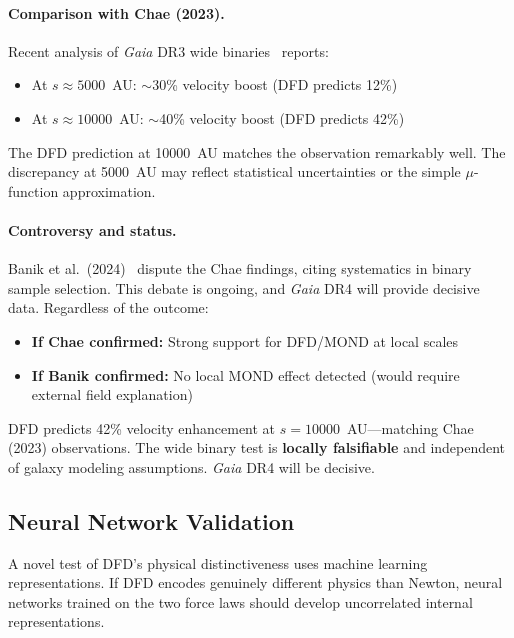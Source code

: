 \paragraph{Comparison with Chae (2023).}
Recent analysis of \textit{Gaia} DR3 wide binaries~\cite{Chae2023} reports:
\begin{itemize}
\item At $s \approx 5000$~AU: $\sim$30\% velocity boost (DFD predicts 12\%)
\item At $s \approx 10000$~AU: $\sim$40\% velocity boost (DFD predicts 42\%)
\end{itemize}
The DFD prediction at 10000~AU matches the observation remarkably well. The discrepancy at 5000~AU may reflect statistical uncertainties or the simple $\mu$-function approximation.

\paragraph{Controversy and status.}
Banik et al.\ (2024)~\cite{Banik2024} dispute the Chae findings, citing systematics in binary sample selection. This debate is ongoing, and \textit{Gaia} DR4 will provide decisive data. Regardless of the outcome:
\begin{itemize}
\item \textbf{If Chae confirmed:} Strong support for DFD/MOND at local scales
\item \textbf{If Banik confirmed:} No local MOND effect detected (would require external field explanation)
\end{itemize}

\begin{tcolorbox}[colback=yellow!5!white, colframe=yellow!60!black, title=Status: Wide Binaries]
DFD predicts 42\% velocity enhancement at $s = 10000$~AU---matching Chae (2023) observations. The wide binary test is \textbf{locally falsifiable} and independent of galaxy modeling assumptions. \textit{Gaia} DR4 will be decisive.
\end{tcolorbox}

\subsection{Neural Network Validation}\label{sec:galactic-neural}

A novel test of DFD's physical distinctiveness uses machine learning representations. If DFD encodes genuinely different physics than Newton, neural networks trained on the two force laws should develop uncorrelated internal representations.

